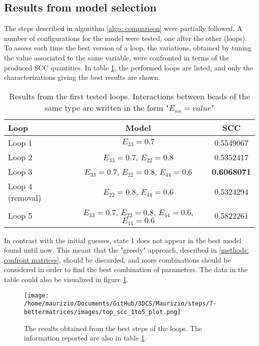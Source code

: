 \subsection{Results from model selection} \label{chap:results_model_selection}

The steps described in algorithm \ref{algo: comparison} were partially followed. A number of configurations for the model were tested, one after the other (loops). To assess each time the best version of a loop, the variations, obtained by tuning the value associated to the same variable, were confronted in terms of the produced SCC quantities. In table \ref{tab:results_model_selection}, the performed loops are listed, and only the characterizations giving the best results are shown. 

\begin{table}[H]
    \centering
    \begin{tabular}{|l|c|c|}
        \hline
        \textbf{Loop} & \textbf{Model} & \textbf{SCC} \\
        \hline
        Loop 1 & $E_{33} = 0.7$ & 0.5549067 \\
        \hline
        Loop 2 & $E_{33} = 0.7$, $E_{22} = 0.8$ & 0.5352417 \\
        \hline
        Loop 3 & $E_{33} = 0.7$, $E_{22} = 0.8$, $E_{44} = 0.6$ & \textbf{0.6068071} \\
        \hline      
        Loop 4 (removal) & $E_{22} = 0.8$, $E_{44} = 0.6$ & 0.5324294 \\
        \hline
        Loop 5 & $E_{33} = 0.7$, $E_{22} = 0.8$, $E_{44} = 0.6$, $E_{11} = 0.6$ & 0.5822261 \\
        \hline    
    \end{tabular}
    \caption{Results from the first tested loops. Interactions between beads of the same type are written in the form "$E_{nn} = value$"}
    \label{tab:results_model_selection}
\end{table}

In contrast with the initial guesses, state 1 does not appear in the best model found until now. This meant that the "greedy" approach, described in \ref{methods: confront matrices}, should be discarded, and more combinations should be considered in order to find the best combination of parameters. The data in the table could also be visualized in figure \ref{fig: loop results}.

\begin{figure}
    \texttt{[image: /home/maurizio/Documents/GitHub/3DCS/Maurizio/steps/7-bettermatrices/images/top\_scc\_1to5\_plot.png]}
    \caption{The results obtained from the best steps of the loops. The information reported are also in table \ref{tab:results_model_selection}.}
    \label{fig: loop results}
\end{figure}

